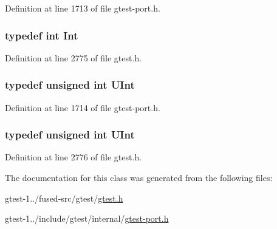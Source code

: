 \-Definition at line 1713 of file gtest-\/port.\-h.

\hypertarget{classtesting_1_1internal_1_1TypeWithSize_3_014_01_4_a7cc214a236ad3bb6ad435bdcf5262a3f}{
\subsubsection[{\-Int}]{\setlength{\rightskip}{0pt plus 5cm}typedef int {\bf \-Int}}}\label{d4/d83/classtesting_1_1internal_1_1TypeWithSize_3_014_01_4_a7cc214a236ad3bb6ad435bdcf5262a3f}


\-Definition at line 2775 of file gtest.\-h.

\hypertarget{classtesting_1_1internal_1_1TypeWithSize_3_014_01_4_aba0996d26f7be2572973245b51852757}{
\subsubsection[{\-U\-Int}]{\setlength{\rightskip}{0pt plus 5cm}typedef unsigned int {\bf \-U\-Int}}}\label{d4/d83/classtesting_1_1internal_1_1TypeWithSize_3_014_01_4_aba0996d26f7be2572973245b51852757}


\-Definition at line 1714 of file gtest-\/port.\-h.

\hypertarget{classtesting_1_1internal_1_1TypeWithSize_3_014_01_4_aba0996d26f7be2572973245b51852757}{
\subsubsection[{\-U\-Int}]{\setlength{\rightskip}{0pt plus 5cm}typedef unsigned int {\bf \-U\-Int}}}\label{d4/d83/classtesting_1_1internal_1_1TypeWithSize_3_014_01_4_aba0996d26f7be2572973245b51852757}


\-Definition at line 2776 of file gtest.\-h.



\-The documentation for this class was generated from the following files\-:\begin{DoxyCompactItemize}
\item 
gtest-\/1../fused-\/src/gtest/\hyperlink{fused-src_2gtest_2gtest_8h}{gtest.\-h}\item 
gtest-\/1../include/gtest/internal/\hyperlink{gtest-port_8h}{gtest-\/port.\-h}\end{DoxyCompactItemize}
